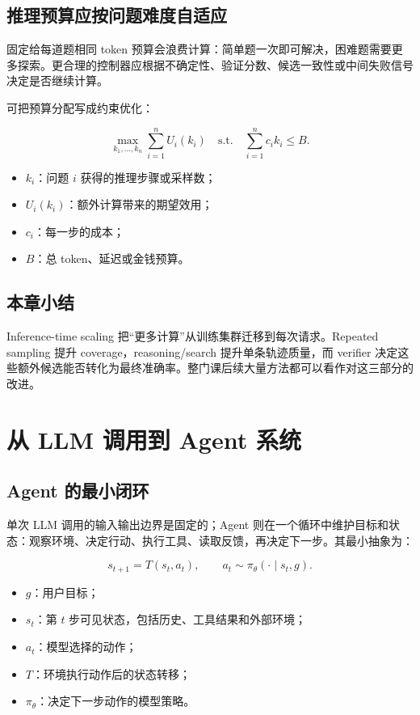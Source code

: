 \documentclass[a4paper]{article}
\begin{document}
\subsection{推理预算应按问题难度自适应}

固定给每道题相同 token 预算会浪费计算：简单题一次即可解决，困难题需要更多探索。更合理的控制器应根据不确定性、验证分数、候选一致性或中间失败信号决定是否继续计算。

可把预算分配写成约束优化：

$$
\max_{k_1,\ldots,k_n}\sum_{i=1}^{n} U_i(k_i)
\quad\text{s.t.}\quad
\sum_{i=1}^{n} c_i k_i\le B.
$$

\begin{itemize}
    \item $k_i$：问题 $i$ 获得的推理步骤或采样数；
    \item $U_i(k_i)$：额外计算带来的期望效用；
    \item $c_i$：每一步的成本；
    \item $B$：总 token、延迟或金钱预算。
\end{itemize}

\subsection{本章小结}

Inference-time scaling 把“更多计算”从训练集群迁移到每次请求。Repeated sampling 提升 coverage，reasoning/search 提升单条轨迹质量，而 verifier 决定这些额外候选能否转化为最终准确率。整门课后续大量方法都可以看作对这三部分的改进。

\section{从 LLM 调用到 Agent 系统}

\subsection{Agent 的最小闭环}

单次 LLM 调用的输入输出边界是固定的；Agent 则在一个循环中维护目标和状态：观察环境、决定行动、执行工具、读取反馈，再决定下一步。其最小抽象为：

$$
s_{t+1}=T(s_t,a_t),\qquad a_t\sim\pi_{\theta}(\cdot\mid s_t,g).
$$

\begin{itemize}
    \item $g$：用户目标；
    \item $s_t$：第 $t$ 步可见状态，包括历史、工具结果和外部环境；
    \item $a_t$：模型选择的动作；
    \item $T$：环境执行动作后的状态转移；
    \item $\pi_{\theta}$：决定下一步动作的模型策略。
\end{itemize}
\end{document}
